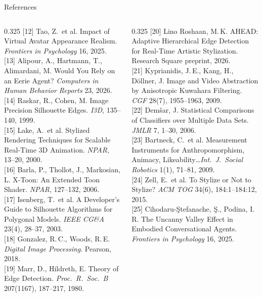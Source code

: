 \documentclass[aspectratio=169,10pt]{beamer}
\begin{document}
\begin{frame}{References}
\begin{columns}[T]
\begin{column}{0.325\textwidth}
      [12] Tao, Z.\ et al. Impact of Virtual Avatar Appearance Realism. \textit{Frontiers in Psychology} 16, 2025.\\[0.3em]
      [13] Alipour, A., Hartmann, T., Alimardani, M. Would You Rely on an Eerie Agent? \textit{Computers in Human Behavior Reports} 23, 2026.\\[0.3em]
      [14] Raskar, R., Cohen, M. Image Precision Silhouette Edges. \textit{I3D}, 135--140, 1999.\\[0.3em]
      [15] Lake, A.\ et al. Stylized Rendering Techniques for Scalable Real-Time 3D Animation. \textit{NPAR}, 13--20, 2000.\\[0.3em]
      [16] Barla, P., Thollot, J., Markosian, L. X-Toon: An Extended Toon Shader. \textit{NPAR}, 127--132, 2006.\\[0.3em]
      [17] Isenberg, T.\ et al. A Developer's Guide to Silhouette Algorithms for Polygonal Models. \textit{IEEE CG\&A} 23(4), 28--37, 2003.\\[0.3em]
      [18] Gonzalez, R.\,C., Woods, R.\,E. \textit{Digital Image Processing}. Pearson, 2018.\\[0.3em]
      [19] Marr, D., Hildreth, E. Theory of Edge Detection. \textit{Proc.\ R.\ Soc.\ B} 207(1167), 187--217, 1980.\\[0.3em]
    \end{column}
    \begin{column}{0.325\textwidth}
      [20] Lino Roshaan, M.\,K. AHEAD: Adaptive Hierarchical Edge Detection for Real-Time Artistic Stylization. Research Square preprint, 2026.\\[0.3em]
      [21] Kyprianidis, J.\,E., Kang, H., D\"ollner, J. Image and Video Abstraction by Anisotropic Kuwahara Filtering. \textit{CGF} 28(7), 1955--1963, 2009.\\[0.3em]
      [22] Dem\v{s}ar, J. Statistical Comparisons of Classifiers over Multiple Data Sets. \textit{JMLR} 7, 1--30, 2006.\\[0.3em]
      [23] Bartneck, C.\ et al. Measurement Instruments for Anthropomorphism, Animacy, Likeability\ldots \textit{Int.\ J.\ Social Robotics} 1(1), 71--81, 2009.\\[0.3em]
      [24] Zell, E.\ et al. To Stylize or Not to Stylize? \textit{ACM TOG} 34(6), 184:1--184:12, 2015.\\[0.3em]
      [25] Cihodaru-\c{S}tefanache, \c{S}., Podina, I.\,R. The Uncanny Valley Effect in Embodied Conversational Agents. \textit{Frontiers in Psychology} 16, 2025.\\[0.3em]

\end{column}
\end{columns}
\end{frame}
\end{document}
